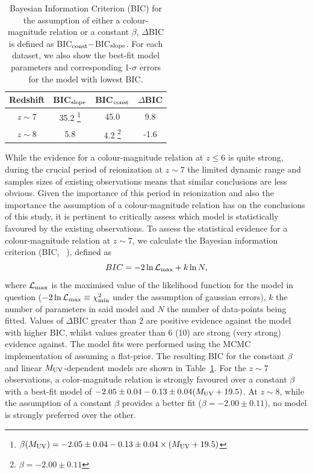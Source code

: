 \begin{table}
\begin{minipage}{0.9\textwidth}
\centering
  \caption[Bayesian Information Criterion (BIC) for the assumption of either a colour-magnitude relation or a constant $\beta$]{Bayesian Information Criterion (BIC) for the assumption of either a colour-magnitude relation or a constant $\beta$, $\Delta$BIC is defined as BIC$_{\rm{const}} -$BIC$_{\rm{slope}}$. For each dataset, we also show the best-fit model parameters and corresponding 1-$\sigma$ errors for the model with lowest BIC.}	
	\begin{tabular}{cccc}\label{tab:BIC_muv}
    	Redshift	& BIC$_{\rm{slope}}$ & BIC$_{\rm{const}}$ & $\Delta$BIC \\
    \hline
	$z\sim7$  & 35.2 \footnote[1]{\( \beta(M_{\rm{UV}}) = -2.05 \pm 0.04 - 0.13 \pm 0.04\times (M_{\rm{UV}} + 19.5)\)}  & 45.0 & 9.8 \\
	$z\sim8$ &  5.8  & 4.2 \footnote[2]{\( \beta = -2.00 \pm 0.11 \)} & -1.6 \\
  \end{tabular}
  \end{minipage}

\end{table}

While the evidence for a colour-magnitude relation at $z\leq6$ is quite strong, during the crucial period of reionization at $z\sim7$ the limited dynamic range and samples sizes of existing observations means that similar conclusions are less obvious. Given the importance of this period in reionization and also the importance the assumption of a colour-magnitude relation has on the conclusions of this study, it is pertinent to critically assess which model is statistically favoured by the existing observations. To assess the statistical evidence for a colour-magnitude relation at $z\sim7$, we calculate the Bayesian information criterion (BIC, \citeauthor{Schwarz:1978uv}~\citeyear{Schwarz:1978uv}), defined as
\begin{equation}
	BIC = 	-2 \ln\mathcal{L}_{\rm{max}} + k \ln N,
\end{equation}
where $\mathcal{L}_{\rm{max}}$ is the maximised value of the likelihood function for the model in question ($-2 \ln \mathcal{L}_{\rm{max}} \equiv \chi^{2}_{\rm{min}}$ under the assumption of gaussian errors), $k$ the number of parameters in said model and $N$ the number of data-points being fitted. Values of $\Delta$BIC greater than 2 are positive evidence against the model with higher BIC, whilst values greater than 6 (10) are strong (very strong) evidence against. The model fits were performed using the MCMC implementation of \citet{ForemanMackey:2013io} assuming a flat-prior. The resulting BIC for the constant $\beta$ and linear $M_{\rm{UV}}$-dependent models are shown in Table~\ref{tab:BIC_muv}. For the $z\sim7$ observations, a color-magnitude relation is strongly favoured over a constant $\beta$ with a best-fit model of \( -2.05\pm0.04 -0.13\pm0.04(M_{\rm{UV}} + 19.5)\). At $z\sim8$, while the assumption of a constant $\beta$ provides a better fit ($\beta = -2.00 \pm 0.11$), no model is strongly preferred over the other.

